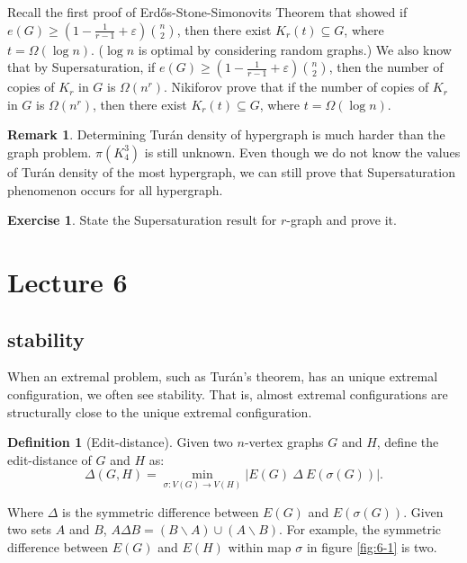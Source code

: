 \documentclass{article}
\theoremstyle{definition}
\newtheorem{remark}[theorem]{Remark}
\newtheorem{definition}[theorem]{Definition}
\newtheorem{exercise}[theorem]{Exercise}
\def\Erdos{Erd\H{o}s}
\def\Turan{Tur\'an}
\renewcommand{\epsilon}{\varepsilon}
\begin{document}
Recall the first proof of \Erdos{}-Stone-Simonovits Theorem that showed if $e(G)\geq (1-\frac{1}{r-1}+\epsilon)\binom{n}{2}$, then there exist $K_r(t)\subseteq G$, where $t=\Omega(\log n)$. ($\log n$ is optimal by considering random graphs.) We also know that by Supersaturation, if $e(G)\geq (1-\frac{1}{r-1}+\epsilon)\binom{n}{2}$, then the number of copies of $K_r$ in $G$ is $\Omega(n^r)$. Nikiforov\cite{Nikiforov2007GraphsWM} prove that if the number of copies of $K_r$  in $G$ is $\Omega(n^r)$, then there exist $K_r(t)\subseteq G$, where $t=\Omega(\log n)$.

\begin{remark}
    Determining \Turan{} density of hypergraph is much harder than the graph problem. $\pi(K_4^3)$ is still unknown. Even though we do not know the values of \Turan{} density of the most hypergraph, we can still prove that Supersaturation phenomenon occurs for all hypergraph.
\end{remark}

\begin{exercise}
    State the Supersaturation result for $r$-graph and prove it.
\end{exercise}


\newpage
\section{Lecture 6}
\subsection{stability}
When an extremal problem, such as \Turan{}'s theorem, has an unique extremal configuration, we often see stability. That is, almost extremal configurations are structurally close to the unique extremal configuration.

\begin{definition}[Edit-distance]{}{}
    Given two $n$-vertex graphs $G$ and $H$, define the edit-distance of $G$ and $H$ as: 
    $$\Delta(G,H) = \min_{\sigma : V(G) \rightarrow V(H)} |E(G)\ \Delta \ E(\sigma(G))|. $$
\end{definition}
Where $\Delta$ is the symmetric difference between $E(G)$ and $E(\sigma(G))$. Given two sets $A$ and $B$, $A \Delta B = (B\backslash A)\cup(A \backslash B)$. For example, the symmetric difference between $E(G)$ and $E(H)$ within map $\sigma$ in figure \ref{fig:6-1} is two.
\end{document}
